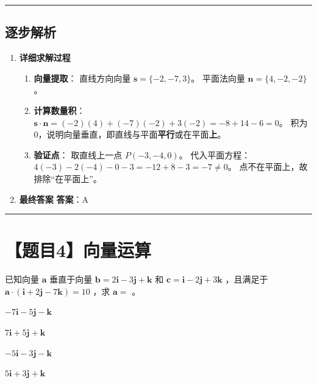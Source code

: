 \documentclass[UTF8]{ctexart}
\newenvironment{redenv}{\color{red}}{}
\newenvironment{detailedanalysis}{%
    \color{red}
    \begin{enumerate}[label=\textbf{第\arabic*步：}, leftmargin=*, align=left, itemsep=1.5ex]
}{%
    \end{enumerate}
}
\newcommand{\problemrule}{\noindent\rule{\textwidth}{1.5pt}\vspace{-0.8em}}
\newcommand{\analysisrule}{\noindent\rule{\textwidth}{0.8pt}\vspace{-0.8em}}
\newcommand{\choicesTwo}[4]{
    \begin{enumerate}[label=\Alph*., itemsep=0pt, parsep=0pt, topsep=5pt, labelsep=0.5em]
        \begin{minipage}{0.45\linewidth} \item #1 \end{minipage}
        \begin{minipage}{0.45\linewidth} \item #2 \end{minipage}
        \begin{minipage}{0.45\linewidth} \item #3 \end{minipage}
        \begin{minipage}{0.45\linewidth} \item #4 \end{minipage}
    \end{enumerate}
}
\newcommand{\blank}[1]{\underline{\hspace{#1}}}
\begin{document}
\begin{redenv}
\analysisrule
\subsection*{逐步解析}

\begin{detailedanalysis}
\item \textbf{详细求解过程}
\begin{enumerate}[label=(\arabic*)]
\item \textbf{向量提取}：
直线方向向量 $\mathbf{s} = \{-2, -7, 3\}$。
平面法向量 $\mathbf{n} = \{4, -2, -2\}$。
\item \textbf{计算数量积}：
$\mathbf{s} \cdot \mathbf{n} = (-2)(4) + (-7)(-2) + 3(-2) = -8 + 14 - 6 = 0$。
积为0，说明向量垂直，即直线与平面\textbf{平行}或在平面\textbf{上}。
\item \textbf{验证点}：
取直线上一点 $P(-3, -4, 0)$。
代入平面方程：$4(-3) - 2(-4) - 0 - 3 = -12 + 8 - 3 = -7 \neq 0$。
点不在平面上，故排除“在平面上”。
\end{enumerate}

\item \textbf{最终答案}
\textbf{答案}：A
\end{detailedanalysis}
\end{redenv}

\problemrule
\section*{【题目4】向量运算}
已知向量 $\mathbf{a}$ 垂直于向量 $ \mathbf{b} = 2\mathbf{i} - 3\mathbf{j} + \mathbf{k} $ 和 $ \mathbf{c} = \mathbf{i} - 2\mathbf{j} + 3\mathbf{k} $ ，且满足于 $ \mathbf{a} \cdot (\mathbf{i} + 2\mathbf{j} - 7\mathbf{k}) = 10 $ ，求 $\mathbf{a} =$ \blank{1cm}。
\choicesTwo
{$ -7\mathbf{i} - 5\mathbf{j} - \mathbf{k} $}
{$ 7\mathbf{i} + 5\mathbf{j} + \mathbf{k} $}
{$ -5\mathbf{i} - 3\mathbf{j} - \mathbf{k} $}
{$ 5\mathbf{i} + 3\mathbf{j} + \mathbf{k} $}
\end{document}
